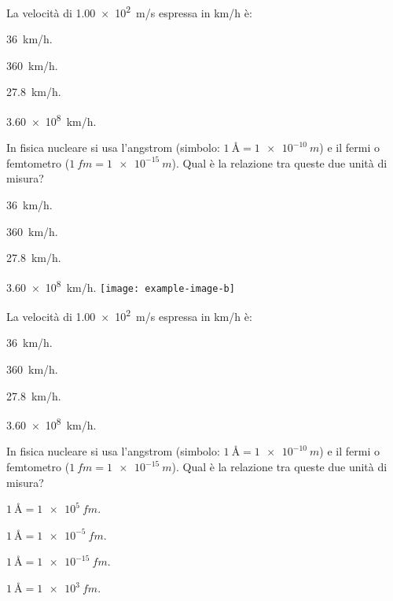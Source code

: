 \documentclass{article}
\newcommand*{\mySquared}[1]{%
  \begin{tikzpicture}[baseline=(number.base),square/.style={regular polygon,regular polygon sides=4}]
    \node[square, rounded corners=1pt, inner sep=1pt, draw=none, fill=gray!40] (number) {#1};
  \end{tikzpicture}%
}
\begin{document}
\begin{enumext}[columns=1,save-ans=sabastiano2,mark-pos=left,mark-ans=$\checkmark$,save-ref=true,show-pos=true,itemsep=0pt]
 \item La velocità di \SI{1,00e2}{m/s} espressa in \si{km/h} è:
   \begin{keyans*}[mini-env=0.5\linewidth, mini-right* = { \texttt{[image: example-image-b]} \captionof*{figure}{A table} }]
     \item \SI{36}{km/h}.
     \item* \SI{360}{km/h}.
     \item \SI{27,8}{km/h}.
     \item \SI{3,60e8}{km/h}.
   \end{keyans*}

 \item In fisica nucleare si usa l'angstrom (simbolo:
 $\SI{1}{\angstrom} = \SI{1e-10}{m}$) e il fermi o femtometro
 ($\SI{1}{fm} = \SI{1e-15}{m}$). Qual è la relazione tra queste due
 unità di misura?
   \begin{keyans}[mini-env=0.5\linewidth]
     \item \SI{36}{km/h}.
     \item \SI{360}{km/h}.
     \item* \SI{27,8}{km/h}.
     \item \SI{3,60e8}{km/h}.
     \miniright
     \texttt{[image: example-image-b]}
   \end{keyans}

 \item La velocità di \SI{1,00e2}{m/s} espressa in \si{km/h} è:
   \begin{keyans*}
     \item \SI{36}{km/h}.
     \item* \SI{360}{km/h}.
     \item \SI{27,8}{km/h}.
     \item \SI{3,60e8}{km/h}.
   \end{keyans*}

 \item In fisica nucleare si usa l'angstrom (simbolo:
 $\SI{1}{\angstrom} = \SI{1e-10}{m}$) e il fermi o femtometro
 ($\SI{1}{fm} = \SI{1e-15}{m}$). Qual è la relazione tra queste due
 unità di misura?
   \begin{keyans*}[columns=2,mini-env=0.25\linewidth, mini-right*={\texttt{[image: example-image-b]}}]
     \item* $\SI{1}{\angstrom}=\SI{1e5}{fm}$.
     \item $\SI{1}{\angstrom}=\SI{1e-5}{fm}$.
     \item $\SI{1}{\angstrom}=\SI{1e-15}{fm}$.
     \item $\SI{1}{\angstrom}=\SI{1e3}{fm}$.
   \end{keyans*}
\end{enumext}

\end{document}
